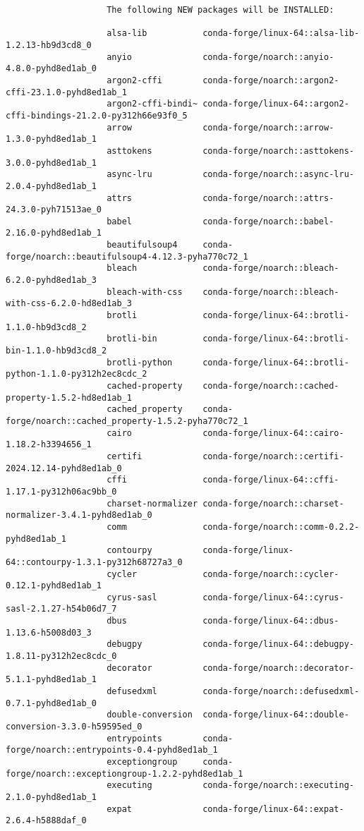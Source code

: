 \documentclass{article}
\begin{document}
\begin{enumerate}
\begin{itemize}
\begin{itemize}
\begin{itemize}
\begin{verbatim}
					The following NEW packages will be INSTALLED:
					
					alsa-lib           conda-forge/linux-64::alsa-lib-1.2.13-hb9d3cd8_0 
					anyio              conda-forge/noarch::anyio-4.8.0-pyhd8ed1ab_0 
					argon2-cffi        conda-forge/noarch::argon2-cffi-23.1.0-pyhd8ed1ab_1 
					argon2-cffi-bindi~ conda-forge/linux-64::argon2-cffi-bindings-21.2.0-py312h66e93f0_5 
					arrow              conda-forge/noarch::arrow-1.3.0-pyhd8ed1ab_1 
					asttokens          conda-forge/noarch::asttokens-3.0.0-pyhd8ed1ab_1 
					async-lru          conda-forge/noarch::async-lru-2.0.4-pyhd8ed1ab_1 
					attrs              conda-forge/noarch::attrs-24.3.0-pyh71513ae_0 
					babel              conda-forge/noarch::babel-2.16.0-pyhd8ed1ab_1 
					beautifulsoup4     conda-forge/noarch::beautifulsoup4-4.12.3-pyha770c72_1 
					bleach             conda-forge/noarch::bleach-6.2.0-pyhd8ed1ab_3 
					bleach-with-css    conda-forge/noarch::bleach-with-css-6.2.0-hd8ed1ab_3 
					brotli             conda-forge/linux-64::brotli-1.1.0-hb9d3cd8_2 
					brotli-bin         conda-forge/linux-64::brotli-bin-1.1.0-hb9d3cd8_2 
					brotli-python      conda-forge/linux-64::brotli-python-1.1.0-py312h2ec8cdc_2 
					cached-property    conda-forge/noarch::cached-property-1.5.2-hd8ed1ab_1 
					cached_property    conda-forge/noarch::cached_property-1.5.2-pyha770c72_1 
					cairo              conda-forge/linux-64::cairo-1.18.2-h3394656_1 
					certifi            conda-forge/noarch::certifi-2024.12.14-pyhd8ed1ab_0 
					cffi               conda-forge/linux-64::cffi-1.17.1-py312h06ac9bb_0 
					charset-normalizer conda-forge/noarch::charset-normalizer-3.4.1-pyhd8ed1ab_0 
					comm               conda-forge/noarch::comm-0.2.2-pyhd8ed1ab_1 
					contourpy          conda-forge/linux-64::contourpy-1.3.1-py312h68727a3_0 
					cycler             conda-forge/noarch::cycler-0.12.1-pyhd8ed1ab_1 
					cyrus-sasl         conda-forge/linux-64::cyrus-sasl-2.1.27-h54b06d7_7 
					dbus               conda-forge/linux-64::dbus-1.13.6-h5008d03_3 
					debugpy            conda-forge/linux-64::debugpy-1.8.11-py312h2ec8cdc_0 
					decorator          conda-forge/noarch::decorator-5.1.1-pyhd8ed1ab_1 
					defusedxml         conda-forge/noarch::defusedxml-0.7.1-pyhd8ed1ab_0 
					double-conversion  conda-forge/linux-64::double-conversion-3.3.0-h59595ed_0 
					entrypoints        conda-forge/noarch::entrypoints-0.4-pyhd8ed1ab_1 
					exceptiongroup     conda-forge/noarch::exceptiongroup-1.2.2-pyhd8ed1ab_1 
					executing          conda-forge/noarch::executing-2.1.0-pyhd8ed1ab_1 
					expat              conda-forge/linux-64::expat-2.6.4-h5888daf_0 

\end{verbatim}
\end{itemize}
\end{itemize}
\end{itemize}
\end{enumerate}
\end{document}
